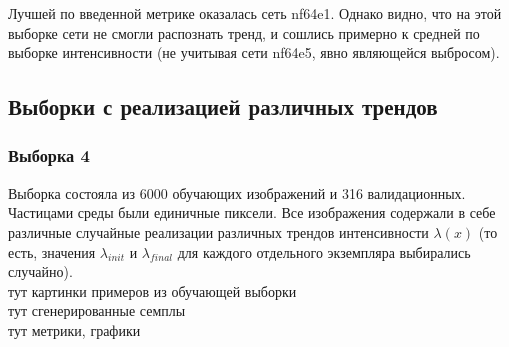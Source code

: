			Лучшей по введенной метрике оказалась сеть nf64e1. Однако видно, что на этой выборке сети не смогли распознать тренд, и сошлись примерно к средней по выборке интенсивности (не учитывая сети nf64e5, явно являющейся выбросом).
		
	\subsection{Выборки с реализацией различных трендов}
		\subsubsection{Выборка 4}
			Выборка состояла из 6000 обучающих изображений и 316 валидационных. Частицами среды были единичные пиксели. Все изображения содержали в себе различные случайные реализации различных трендов интенсивности $\lambda(x)$ (то есть, значения $\lambda_{init}$ и $\lambda_{final}$ для каждого отдельного экземпляра выбирались случайно). \\
			тут картинки примеров из обучающей выборки \\
			тут сгенерированные семплы \\
			тут метрики, графики